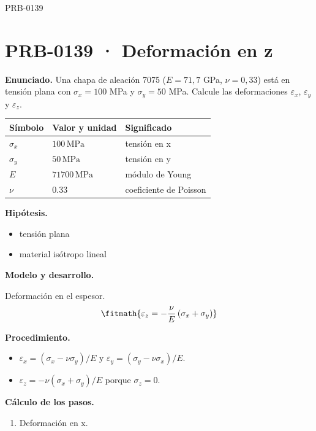 \begin{studiumworked}{PRB-0139}

\section{PRB-0139 · Deformación en z}

\textbf{Enunciado.} Una chapa de aleación 7075 ($E = 71{,}7$ GPa, $\nu = 0{,}33$) está en tensión plana con $\sigma_x = 100$ MPa y $\sigma_y = 50$ MPa. Calcule las deformaciones $\varepsilon_x$, $\varepsilon_y$ y $\varepsilon_z$.

\par\medskip\noindent\begin{tabular}{@{}p{.18\linewidth}p{.26\linewidth}p{.48\linewidth}@{}}
\toprule Símbolo & Valor y unidad & Significado\\\midrule
$\sigma_{x}$ & $100\,\mathrm{MPa}$ & tensión en x\\
$\sigma_{y}$ & $50\,\mathrm{MPa}$ & tensión en y\\
$E$ & $71700\,\mathrm{MPa}$ & módulo de Young\\
$\nu$ & $0.33$ & coeficiente de Poisson\\
\bottomrule\end{tabular}\par\medskip

\textbf{Hipótesis.}\begin{itemize}\item tensión plana
\item material isótropo lineal\end{itemize}

\textbf{Modelo y desarrollo.}

Deformación en el espesor.\[\fitmath{\varepsilon_z = -\frac{\nu}{E}\left(\sigma_x + \sigma_y\right)}\]

\textbf{Procedimiento.}\begin{itemize}\item $\varepsilon_x = (\sigma_x - \nu\sigma_y)/E$ y $\varepsilon_y = (\sigma_y - \nu\sigma_x)/E$.
\item $\varepsilon_z = -\nu(\sigma_x + \sigma_y)/E$ porque $\sigma_z = 0$.\end{itemize}

\textbf{Cálculo de los pasos.}

\begin{enumerate}

\item Deformación en x.


\end{enumerate}
\end{studiumworked}
